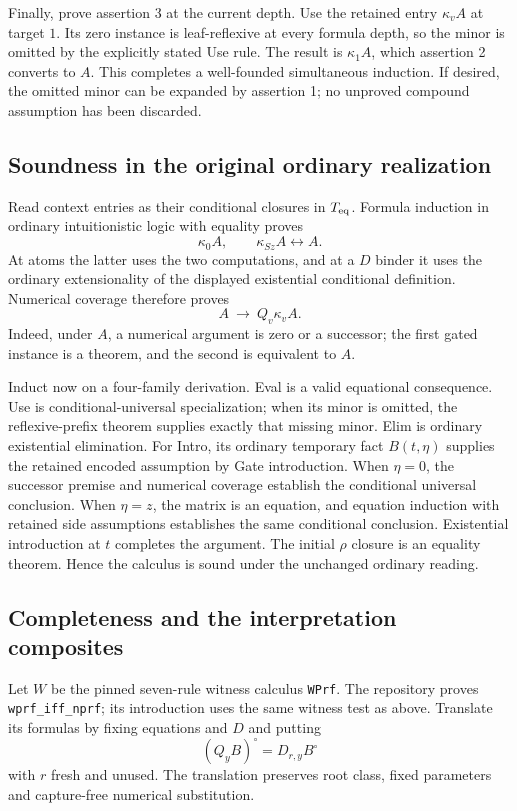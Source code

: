 \documentclass[11pt]{article}
\theoremstyle{definition}\newtheorem{definition}[theorem]{Definition}
\theoremstyle{remark}\newtheorem{remark}[theorem]{Remark}
\begin{document}
Finally, prove assertion 3 at the current depth.  Use the retained entry
$\kappa_vA$ at target $1$.  Its zero instance is leaf-reflexive at every
formula depth, so the minor is omitted by the explicitly stated Use
rule.  The result is $\kappa_1A$, which assertion 2 converts to $A$.
This completes a well-founded simultaneous induction.  If desired, the
omitted minor can be expanded by assertion 1; no unproved compound
assumption has been discarded.

\subsection{Soundness in the original ordinary realization}

Read context entries as their conditional closures in $T_{\rm eq}$.
Formula induction in ordinary intuitionistic logic with equality proves
\[
 \kappa_0A,\qquad \kappa_{Sz}A\leftrightarrow A.
\]
At atoms the latter uses the two computations, and at a $D$ binder it
uses the ordinary extensionality of the displayed existential conditional
definition.  Numerical coverage therefore proves
\[
 A\ \longrightarrow\ Q_v\kappa_vA.
 \tag{Gate introduction}
\]
Indeed, under $A$, a numerical argument is zero or a successor; the
first gated instance is a theorem, and the second is equivalent to $A$.

Induct now on a four-family derivation.  Eval is a valid equational
consequence.  Use is conditional-universal specialization; when its
minor is omitted, the reflexive-prefix theorem supplies exactly that
missing minor.  Elim is ordinary existential elimination.  For Intro, its
ordinary temporary fact $B(t,\eta)$ supplies the retained encoded
assumption by Gate introduction.  When $\eta=0$, the successor premise
and numerical coverage establish the conditional universal conclusion.
When $\eta=z$, the matrix is an equation, and equation induction with
retained side assumptions establishes the same conditional conclusion.
Existential introduction at $t$ completes the argument.  The initial
$\rho$ closure is an equality theorem.  Hence the calculus is sound
under the unchanged ordinary reading.

\subsection{Completeness and the interpretation composites}

Let $W$ be the pinned seven-rule witness calculus \texttt{WPrf}.  The
repository proves \texttt{wprf\_iff\_nprf}; its introduction uses the
same witness test as above.  Translate its formulas by fixing equations
and $D$ and putting
\[
 (Q_yB)^\circ=D_{r,y}B^\circ
\]
with $r$ fresh and unused.  The translation preserves root class, fixed
parameters and capture-free numerical substitution.
\end{document}
